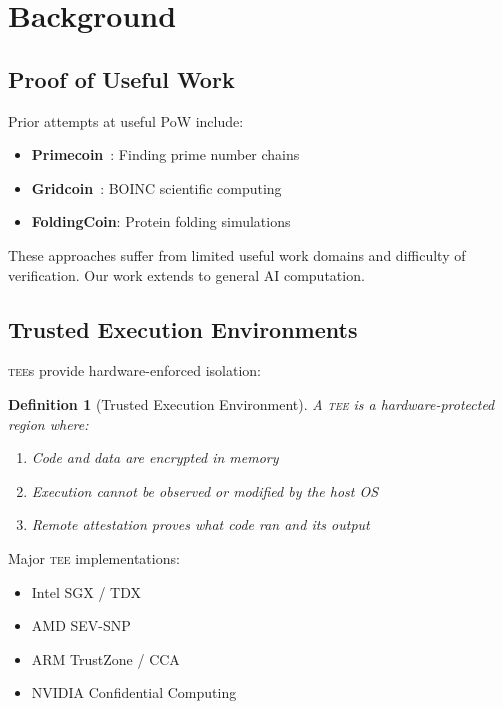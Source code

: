 \documentclass[11pt,letterpaper]{article}
\newtheorem{definition}{Definition}[section]
\newcommand{\TEE}{\textsc{tee}}
\begin{document}
\section{Background}

\subsection{Proof of Useful Work}

Prior attempts at useful PoW include:

\begin{itemize}
    \item \textbf{Primecoin}~\cite{king2013primecoin}: Finding prime number chains
    \item \textbf{Gridcoin}~\cite{gridcoin2014}: BOINC scientific computing
    \item \textbf{FoldingCoin}: Protein folding simulations
\end{itemize}

These approaches suffer from limited useful work domains and difficulty of verification. Our work extends to general AI computation.

\subsection{Trusted Execution Environments}

\TEE{}s provide hardware-enforced isolation:

\begin{definition}[Trusted Execution Environment]
A \TEE{} is a hardware-protected region where:
\begin{enumerate}
    \item Code and data are encrypted in memory
    \item Execution cannot be observed or modified by the host OS
    \item Remote attestation proves what code ran and its output
\end{enumerate}
\end{definition}

Major \TEE{} implementations:
\begin{itemize}
    \item Intel SGX / TDX
    \item AMD SEV-SNP
    \item ARM TrustZone / CCA
    \item NVIDIA Confidential Computing
\end{itemize}
\end{document}
